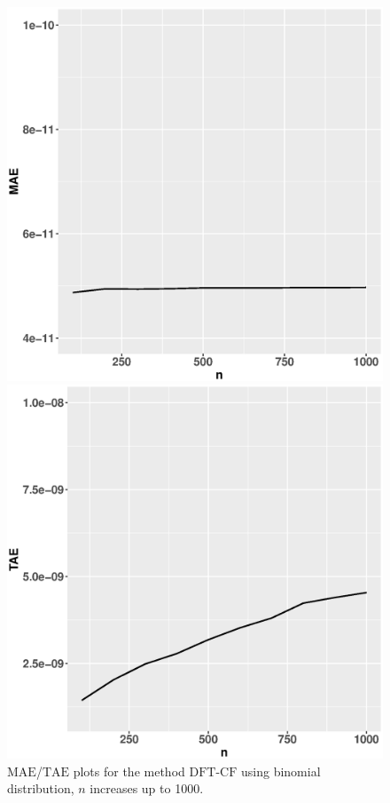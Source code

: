 \documentclass[12pt]{article}
\newcommand{\TAE}{{\textrm{TAE}}}
\newcommand{\MAE}{{\textrm{MAE}}}
\newcommand{\dft}{{\textrm{DFT-CF}}}
\begin{document}
\begin{figure}
    \centering
    \begin{minipage}{0.45\textwidth}
        \centering
        \includegraphics[width=1\textwidth]{figures/bino_mae.eps} 
    \end{minipage}\hfill
    \begin{minipage}{0.45\textwidth}
        \centering
        \includegraphics[width=1\textwidth]{figures/bino_tae.eps} 
    \end{minipage}
    \caption{$\MAE$/$\TAE$ plots for the method $\dft$ using binomial distribution, $n$ increases up to 1000.}
    \label{fig:mae.tae.bino}
\end{figure}
\end{document}
